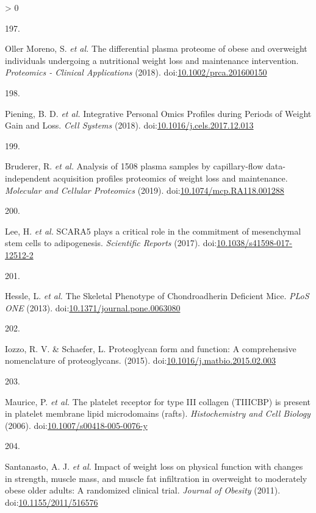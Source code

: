 \documentclass[11pt,twoside]{bristolthesis}
\newlength{\cslhangindent}
\newlength{\csllabelwidth}
\newenvironment{CSLReferences}[2] %
 {%
  \setlength{\parindent}{0pt}
  \ifodd #1 \everypar{\setlength{\hangindent}{\cslhangindent}}\ignorespaces\fi
  \ifnum #2 > 0
  \setlength{\parskip}{#2\baselineskip}
  \fi
 }%
 {}
\newcommand{\CSLLeftMargin}[1]{\parbox[t]{\csllabelwidth}{#1}}
\newcommand{\CSLRightInline}[1]{\parbox[t]{\linewidth - \csllabelwidth}{#1}\break}
\begin{document}
\begin{CSLReferences}{0}{0}
\leavevmode\hypertarget{ref-OllerMoreno2018}{}%
\CSLLeftMargin{197. }
\CSLRightInline{Oller Moreno, S. \emph{et al.} {The differential plasma proteome of obese and overweight individuals undergoing a nutritional weight loss and maintenance intervention}. \emph{Proteomics - Clinical Applications} (2018). doi:\href{https://doi.org/10.1002/prca.201600150}{10.1002/prca.201600150}}

\leavevmode\hypertarget{ref-Piening2018}{}%
\CSLLeftMargin{198. }
\CSLRightInline{Piening, B. D. \emph{et al.} {Integrative Personal Omics Profiles during Periods of Weight Gain and Loss}. \emph{Cell Systems} (2018). doi:\href{https://doi.org/10.1016/j.cels.2017.12.013}{10.1016/j.cels.2017.12.013}}

\leavevmode\hypertarget{ref-Bruderer2019}{}%
\CSLLeftMargin{199. }
\CSLRightInline{Bruderer, R. \emph{et al.} {Analysis of 1508 plasma samples by capillary-flow data-independent acquisition profiles proteomics of weight loss and maintenance}. \emph{Molecular and Cellular Proteomics} (2019). doi:\href{https://doi.org/10.1074/mcp.RA118.001288}{10.1074/mcp.RA118.001288}}

\leavevmode\hypertarget{ref-Lee2017a}{}%
\CSLLeftMargin{200. }
\CSLRightInline{Lee, H. \emph{et al.} {SCARA5 plays a critical role in the commitment of mesenchymal stem cells to adipogenesis}. \emph{Scientific Reports} (2017). doi:\href{https://doi.org/10.1038/s41598-017-12512-2}{10.1038/s41598-017-12512-2}}

\leavevmode\hypertarget{ref-Hessle2013}{}%
\CSLLeftMargin{201. }
\CSLRightInline{Hessle, L. \emph{et al.} {The Skeletal Phenotype of Chondroadherin Deficient Mice}. \emph{PLoS ONE} (2013). doi:\href{https://doi.org/10.1371/journal.pone.0063080}{10.1371/journal.pone.0063080}}

\leavevmode\hypertarget{ref-Iozzo2015}{}%
\CSLLeftMargin{202. }
\CSLRightInline{Iozzo, R. V. \& Schaefer, L. {Proteoglycan form and function: A comprehensive nomenclature of proteoglycans}. (2015). doi:\href{https://doi.org/10.1016/j.matbio.2015.02.003}{10.1016/j.matbio.2015.02.003}}

\leavevmode\hypertarget{ref-Maurice2006}{}%
\CSLLeftMargin{203. }
\CSLRightInline{Maurice, P. \emph{et al.} {The platelet receptor for type III collagen (TIIICBP) is present in platelet membrane lipid microdomains (rafts)}. \emph{Histochemistry and Cell Biology} (2006). doi:\href{https://doi.org/10.1007/s00418-005-0076-y}{10.1007/s00418-005-0076-y}}

\leavevmode\hypertarget{ref-Santanasto2011}{}%
\CSLLeftMargin{204. }
\CSLRightInline{Santanasto, A. J. \emph{et al.} {Impact of weight loss on physical function with changes in strength, muscle mass, and muscle fat infiltration in overweight to moderately obese older adults: A randomized clinical trial}. \emph{Journal of Obesity} (2011). doi:\href{https://doi.org/10.1155/2011/516576}{10.1155/2011/516576}}


\end{CSLReferences}
\end{document}
